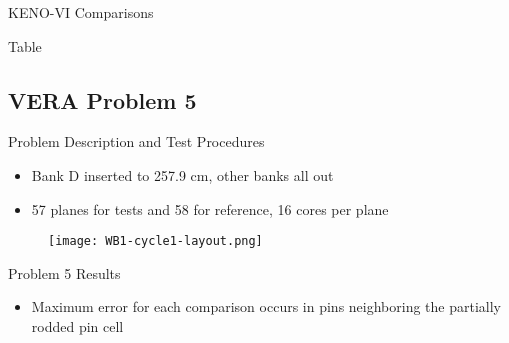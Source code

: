 
\begin{frame}[t]{KENO-VI Comparisons}
    
    Table
    
\end{frame}


\subsection{VERA Problem 5}
\begin{frame}[t]{Problem Description and Test Procedures}
    
    \begin{itemize}
      \item Bank D inserted to 257.9 cm, other banks all out
      \item 57 planes for tests and 58 for reference, 16 cores per plane
    \end{itemize}
    \begin{figure}[h]
      \centering
      \texttt{[image: WB1-cycle1-layout.png]}
    \end{figure}
    
\end{frame}


\begin{frame}[t]{Problem 5 Results}
    
    \begin{table}[h]
      \centering
    \end{table}
    \begin{itemize}
        \item Maximum error for each comparison occurs in pins neighboring the partially rodded pin cell
    \end{itemize}
    
\end{frame}

